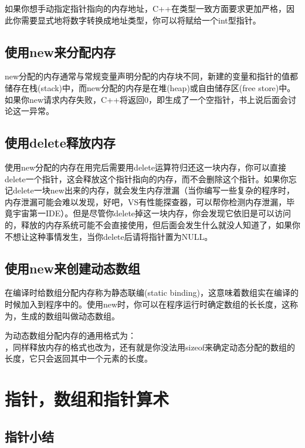 如果你想手动指定指针指向的内存地址，C++在类型一致方面要求更加严格，因此你需要显式地将数字转换成地址类型，你可以将赋给一个int型指针。

\subsection{使用new来分配内存}

new分配的内存通常与常规变量声明分配的内存块不同，新建的变量和指针的值都储存在栈(stack)中，而new分配的内存是在堆(heap)或自由储存区(free store)中。如果你new请求内存失败，C++将返回0，即生成了一个空指针，书上说后面会讨论这一异常。

\subsection{使用delete释放内存}

使用new分配的内存在用完后需要用delete运算符归还这一块内存，你可以直接delete一个指针，这会释放这个指针指向的内存，而不会删除这个指针。如果你忘记delete一块new出来的内存，就会发生内存泄漏（当你编写一些复杂的程序时，内存泄漏可能会难以发现，好吧，VS有性能探查器，可以帮你检测内存泄漏，毕竟宇宙第一IDE）。但是尽管你delete掉这一块内存，你会发现它依旧是可以访问的，释放的内存系统可能不会直接使用，但后面会发生什么就没人知道了，如果你不想让这种事情发生，当你delete后请将指针置为NULL。

\subsection{使用new来创建动态数组}

在编译时给数组分配内存称为静态联编(static binding)，这意味着数组实在编译的时候加入到程序中的。使用new时，你可以在程序运行时确定数组的长长度，这称为，生成的数组叫做动态数组。

为动态数组分配内存的通用格式为：\\ ，同样释放内存的格式也改为，还有就是你没法用sizeof来确定动态分配的数组的长度，它只会返回其中一个元素的长度。

\section{指针，数组和指针算术}

\addtocounter{subsection}{1}

\subsection{指针小结}

